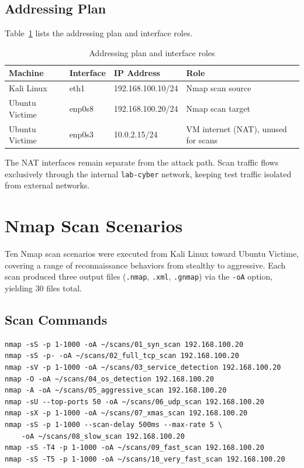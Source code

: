 \subsection{Addressing Plan}

Table~\ref{tab:adressage} lists the addressing plan and interface roles.

\begin{table}[H]
\centering
\caption{Addressing plan and interface roles}
\label{tab:adressage}
\begin{tabular}{llll}
\toprule
\textbf{Machine} & \textbf{Interface} & \textbf{IP Address} & \textbf{Role} \\
\midrule
Kali Linux & eth1 & 192.168.100.10/24 & Nmap scan source \\
Ubuntu Victime & enp0s8 & 192.168.100.20/24 & Nmap scan target \\
Ubuntu Victime & enp0s3 & 10.0.2.15/24 & VM internet (NAT), unused for scans \\
\bottomrule
\end{tabular}
\end{table}

\noindent The NAT interfaces remain separate from the attack path. Scan traffic flows exclusively through the internal \texttt{lab-cyber} network, keeping test traffic isolated from external networks.

\section{Nmap Scan Scenarios}

Ten Nmap scan scenarios were executed from Kali Linux toward Ubuntu Victime, covering a range of reconnaissance behaviors from stealthy to aggressive. Each scan produced three output files (\texttt{.nmap}, \texttt{.xml}, \texttt{.gnmap}) via the \texttt{-oA} option, yielding 30 files total.

\subsection{Scan Commands}

\begin{lstlisting}[caption={Nmap commands executed from Kali Linux}]
nmap -sS -p 1-1000 -oA ~/scans/01_syn_scan 192.168.100.20
nmap -sS -p- -oA ~/scans/02_full_tcp_scan 192.168.100.20
nmap -sV -p 1-1000 -oA ~/scans/03_service_detection 192.168.100.20
nmap -O -oA ~/scans/04_os_detection 192.168.100.20
nmap -A -oA ~/scans/05_aggressive_scan 192.168.100.20
nmap -sU --top-ports 50 -oA ~/scans/06_udp_scan 192.168.100.20
nmap -sX -p 1-1000 -oA ~/scans/07_xmas_scan 192.168.100.20
nmap -sS -p 1-1000 --scan-delay 500ms --max-rate 5 \
    -oA ~/scans/08_slow_scan 192.168.100.20
nmap -sS -T4 -p 1-1000 -oA ~/scans/09_fast_scan 192.168.100.20
nmap -sS -T5 -p 1-1000 -oA ~/scans/10_very_fast_scan 192.168.100.20
\end{lstlisting}

